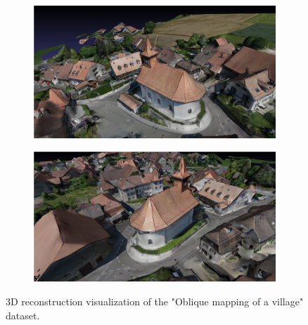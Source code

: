  \begin{figure}
\centering
\begin{subfigure}{.5\textwidth}
  \centering
  \includegraphics[width=\linewidth]{figs/church1.png}
  
\end{subfigure}%
\begin{subfigure}{.5\textwidth}
  \centering
  \includegraphics[width=\linewidth]{figs/church2.png}

\end{subfigure}
\caption{3D reconstruction visualization of the "Oblique mapping of a village" dataset.}
\label{fig:church}
\end{figure}

